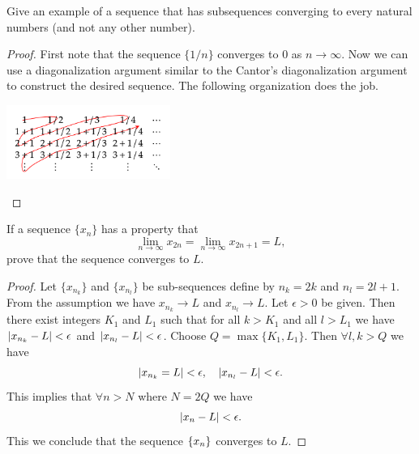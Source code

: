  \begin{problem}
 	Give an example of a sequence that has subsequences converging to every natural numbers (and not any other number).
 \end{problem}
 \begin{proof}
 	First note that the sequence $\{1/n\}$ converges to 0 as $n\to\infty$. Now we can use a diagonalization argument similar to the Cantor's diagonalization argument to construct the desired sequence. The following organization does the job.
 	\begin{center}
 		 \includegraphics[width=0.4\textwidth]{Images/diagSequence.png}
 	\end{center}

 \end{proof}
 
 \begin{problem}
 	If a sequence $\{x_n\}$ has a property that 
 	\[ \lim_{n\to\infty} x_{2n} = \lim_{n\to\infty}x_{2n+1} = L,  \]
 	prove that the sequence converges to $L$.
 \end{problem}
 \begin{proof}
 	Let $\{x_{n_k}\}$ and $\{x_{n_l}\}$ be sub-sequences define by $n_k = 2k$ and $n_l = 2l+1$. From the assumption we have $x_{n_k} \to L$ and $x_{n_l}\to L$.
 	Let $\epsilon>0$ be given. Then there exist integers $K_1$ and $L_1$ such that for all $k>K_1$ and all $l > L_1$ we have $|x_{n_k} - L| < \epsilon$ and $|x_{n_l} - L| < \epsilon$. Choose $Q = \max\{K_1, L_1\}$. Then $\forall l,k > Q$ we have
 	\[ |x_{n_k} = L| < \epsilon, \quad |x_{n_l} - L| < \epsilon. \]
 	This implies that $\forall n>N$ where $N = 2Q$ we have 
 	\[ |x_n - L| < \epsilon. \]
 	This we conclude that the sequence $\{x_n\}$ converges to $L$.
  \end{proof}
  

